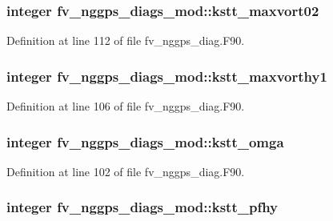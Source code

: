 \subsubsection[{kstt\-\_\-maxvort02}]{\setlength{\rightskip}{0pt plus 5cm}integer fv\-\_\-nggps\-\_\-diags\-\_\-mod\-::kstt\-\_\-maxvort02\hspace{0.3cm}{\ttfamily [private]}}\label{classfv__nggps__diags__mod_a787967d9782109f77ea6e5eff2806d6d}


Definition at line 112 of file fv\-\_\-nggps\-\_\-diag.\-F90.

\subsubsection[{kstt\-\_\-maxvorthy1}]{\setlength{\rightskip}{0pt plus 5cm}integer fv\-\_\-nggps\-\_\-diags\-\_\-mod\-::kstt\-\_\-maxvorthy1\hspace{0.3cm}{\ttfamily [private]}}\label{classfv__nggps__diags__mod_a31273860fe6f1bc0bdd3a07768388d7d}


Definition at line 106 of file fv\-\_\-nggps\-\_\-diag.\-F90.

\subsubsection[{kstt\-\_\-omga}]{\setlength{\rightskip}{0pt plus 5cm}integer fv\-\_\-nggps\-\_\-diags\-\_\-mod\-::kstt\-\_\-omga\hspace{0.3cm}{\ttfamily [private]}}\label{classfv__nggps__diags__mod_aa4455319113ad1862929a6fdf72a5beb}


Definition at line 102 of file fv\-\_\-nggps\-\_\-diag.\-F90.

\subsubsection[{kstt\-\_\-pfhy}]{\setlength{\rightskip}{0pt plus 5cm}integer fv\-\_\-nggps\-\_\-diags\-\_\-mod\-::kstt\-\_\-pfhy\hspace{0.3cm}{\ttfamily [private]}}\label{classfv__nggps__diags__mod_a3bfe44068a85feebd00641d36146f9b3}


